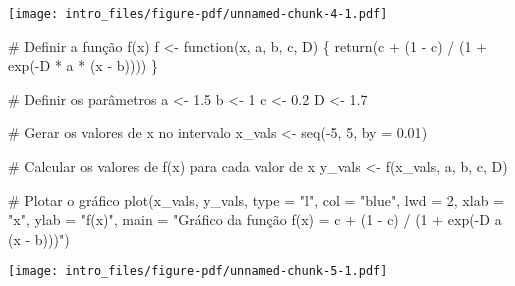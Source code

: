 \documentclass[
  letterpaper,
  DIV=11,
  numbers=noendperiod]{scrreprt}
\newenvironment{Shaded}{\begin{snugshade}}{\end{snugshade}}
\newcommand{\AttributeTok}[1]{\textcolor[rgb]{0.40,0.45,0.13}{#1}}
\newcommand{\CommentTok}[1]{\textcolor[rgb]{0.37,0.37,0.37}{#1}}
\newcommand{\ControlFlowTok}[1]{\textcolor[rgb]{0.00,0.23,0.31}{#1}}
\newcommand{\DecValTok}[1]{\textcolor[rgb]{0.68,0.00,0.00}{#1}}
\newcommand{\FloatTok}[1]{\textcolor[rgb]{0.68,0.00,0.00}{#1}}
\newcommand{\FunctionTok}[1]{\textcolor[rgb]{0.28,0.35,0.67}{#1}}
\newcommand{\NormalTok}[1]{\textcolor[rgb]{0.00,0.23,0.31}{#1}}
\newcommand{\OtherTok}[1]{\textcolor[rgb]{0.00,0.23,0.31}{#1}}
\newcommand{\SpecialCharTok}[1]{\textcolor[rgb]{0.37,0.37,0.37}{#1}}
\newcommand{\StringTok}[1]{\textcolor[rgb]{0.13,0.47,0.30}{#1}}
\begin{document}
\texttt{[image: intro\_files/figure-pdf/unnamed-chunk-4-1.pdf]}

\begin{Shaded}
\begin{Highlighting}[]
\CommentTok{\# Definir a função f(x)}
\NormalTok{f }\OtherTok{\textless{}{-}} \ControlFlowTok{function}\NormalTok{(x, a, b, c, D) \{}
  \FunctionTok{return}\NormalTok{(c }\SpecialCharTok{+}\NormalTok{ (}\DecValTok{1} \SpecialCharTok{{-}}\NormalTok{ c) }\SpecialCharTok{/}\NormalTok{ (}\DecValTok{1} \SpecialCharTok{+} \FunctionTok{exp}\NormalTok{(}\SpecialCharTok{{-}}\NormalTok{D }\SpecialCharTok{*}\NormalTok{ a }\SpecialCharTok{*}\NormalTok{ (x }\SpecialCharTok{{-}}\NormalTok{ b))))}
\NormalTok{\}}

\CommentTok{\# Definir os parâmetros}
\NormalTok{a }\OtherTok{\textless{}{-}} \FloatTok{1.5}
\NormalTok{b }\OtherTok{\textless{}{-}} \DecValTok{1}
\NormalTok{c }\OtherTok{\textless{}{-}} \FloatTok{0.2}
\NormalTok{D }\OtherTok{\textless{}{-}} \FloatTok{1.7}

\CommentTok{\# Gerar os valores de x no intervalo}
\NormalTok{x\_vals }\OtherTok{\textless{}{-}} \FunctionTok{seq}\NormalTok{(}\SpecialCharTok{{-}}\DecValTok{5}\NormalTok{, }\DecValTok{5}\NormalTok{, }\AttributeTok{by =} \FloatTok{0.01}\NormalTok{)}

\CommentTok{\# Calcular os valores de f(x) para cada valor de x}
\NormalTok{y\_vals }\OtherTok{\textless{}{-}} \FunctionTok{f}\NormalTok{(x\_vals, a, b, c, D)}

\CommentTok{\# Plotar o gráfico}
\FunctionTok{plot}\NormalTok{(x\_vals, y\_vals, }\AttributeTok{type =} \StringTok{"l"}\NormalTok{, }\AttributeTok{col =} \StringTok{"blue"}\NormalTok{, }\AttributeTok{lwd =} \DecValTok{2}\NormalTok{,}
     \AttributeTok{xlab =} \StringTok{"x"}\NormalTok{, }\AttributeTok{ylab =} \StringTok{"f(x)"}\NormalTok{, }\AttributeTok{main =} \StringTok{"Gráfico da função f(x) = c + (1 {-} c) / (1 + exp({-}D a (x {-} b)))"}\NormalTok{)}
\end{Highlighting}
\end{Shaded}

\texttt{[image: intro\_files/figure-pdf/unnamed-chunk-5-1.pdf]}
\end{document}
